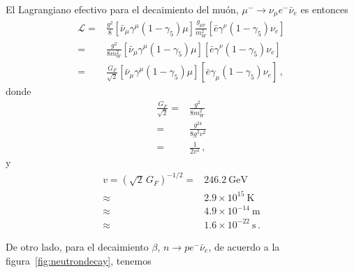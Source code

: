 \begin{frame}
El Lagrangiano efectivo para el decaimiento del muón, $\mu^-\to \nu_\mu e^- \bar{\nu}_e$ es entonces
\begin{align}
  \mathcal{L}=&\frac{g^2}{8}\left[\bar{\nu}_\mu\gamma^\mu(1-\gamma_5)\mu\right]\frac{g_{\mu\nu}}{m_W^2}
  \left[\bar{e}\gamma^\nu(1-\gamma_5)\nu_e\right]\nonumber\\
=&\frac{g^2}{8m_W^2}\left[\bar{\nu}_\mu\gamma^\mu(1-\gamma_5)\mu\right]
  \left[\bar{e}\gamma^\nu(1-\gamma_5)\nu_e\right]\nonumber\\
  =&\frac{G_F}{\sqrt{2}}\left[\bar{\nu}_\mu\gamma^\mu(1-\gamma_5)\mu\right]\left[\bar{e}\gamma_\mu(1-\gamma_5)\nu_e\right]\,,
\end{align}
donde
\begin{align}
  \frac{G_F}{\sqrt{2}}=&\frac{g^2}{8m_W^2}\nonumber\\
  =&\frac{g^24}{8g^2v^2}\nonumber\\
  =&\frac{1}{2v^2}\,,
\end{align}
y
\begin{align}
  v=\left(\sqrt{2}\,G_F\right)^{-1/2}=&246.2\ \text{GeV}\nonumber\\
 \approx&2.9\times 10^{15}\ \text{K} \nonumber\\
 \approx&4.9\times 10^{-14}\ \text{m} \nonumber\\
 \approx&1.6\times 10^{-22}\ \text{s} \,.
\end{align}


De otro lado, para el  decaimiento $\beta$, $n\to p e^- \bar{\nu}_e$, de acuerdo a la figura~\ref{fig:neutrondecay}, tenemos


\end{frame}
